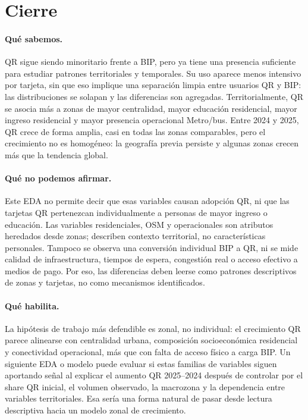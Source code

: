 \documentclass[11pt,letterpaper]{article}
\begin{document}
\clearpage

\section{Cierre}

\paragraph{Qué sabemos.}
QR sigue siendo minoritario frente a BIP, pero ya tiene una presencia suficiente
para estudiar patrones territoriales y temporales. Su uso aparece menos intensivo
por tarjeta, sin que eso implique una separación limpia entre usuarios QR y BIP:
las distribuciones se solapan y las diferencias son agregadas. Territorialmente,
QR se asocia más a zonas de mayor centralidad, mayor educación residencial, mayor
ingreso residencial y mayor presencia operacional Metro/bus. Entre 2024 y 2025,
QR crece de forma amplia, casi en todas las zonas comparables, pero el crecimiento
no es homogéneo: la geografía previa persiste y algunas zonas crecen más que la
tendencia global.

\paragraph{Qué no podemos afirmar.}
Este EDA no permite decir que esas variables causan adopción QR, ni que las
tarjetas QR pertenezcan individualmente a personas de mayor ingreso o educación.
Las variables residenciales, OSM y operacionales son atributos heredados desde
zonas; describen contexto territorial, no características personales. Tampoco se
observa una conversión individual BIP a QR, ni se mide calidad de infraestructura,
tiempos de espera, congestión real o acceso efectivo a medios de pago. Por eso,
las diferencias deben leerse como patrones descriptivos de zonas y tarjetas, no
como mecanismos identificados.

\paragraph{Qué habilita.}
La hipótesis de trabajo más defendible es zonal, no individual: el crecimiento QR
parece alinearse con centralidad urbana, composición socioeconómica residencial y
conectividad operacional, más que con falta de acceso físico a carga BIP. Un
siguiente EDA o modelo puede evaluar si estas familias de variables siguen
aportando señal al explicar el aumento QR 2025--2024 después de controlar por el
share QR inicial, el volumen observado, la macrozona y la dependencia entre
variables territoriales. Esa sería una forma natural de pasar desde lectura
descriptiva hacia un modelo zonal de crecimiento.
\end{document}
